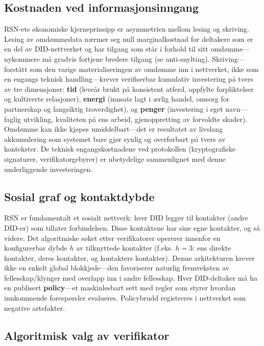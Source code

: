 \documentclass[11pt,a4paper,twocolumn]{article}
\begin{document}
\subsection{Kostnaden ved informasjonsinngang}

RSN-ets økonomiske kjerneprinsipp er asymmetrien mellom lesing og skriving. Lesing av omdømmedata nærmer seg null marginalkostnad for deltakere som er en del av DID-nettverket og har tilgang som står i forhold til sitt omdømme---nykommere må gradvis fortjene bredere tilgang (se anti-snylting). Skriving---forstått som den varige materialiseringen av omdømme inn i nettverket, ikke som en engangs teknisk handling---krever verifiserbar kumulativ investering på tvers av tre dimensjoner: \textbf{tid} (leveår brukt på konsistent atferd, oppfylte forpliktelser og kultiverte relasjoner), \textbf{energi} (innsats lagt i ærlig handel, omsorg for partnerskap og langsiktig troverdighet), og \textbf{penger} (investering i eget navn---faglig utvikling, kvaliteten på ens arbeid, gjenoppretting av forvoldte skader). Omdømme kan ikke kjøpes umiddelbart---det er resultatet av livslang akkumulering som systemet bare gjør synlig og overførbart på tvers av kontekster. De teknisk engangskostnadene ved protokollen (kryptografiske signaturer, verifikatorgebyrer) er ubetydelige sammenlignet med denne underliggende investeringen.

\subsection{Sosial graf og kontaktdybde}

RSN er fundamentalt et sosialt nettverk: hver DID legger til kontakter (andre DID-er) som tillater forbindelsen. Disse kontaktene har sine egne kontakter, og så videre. Det algoritmiske søket etter verifikatorer opererer innenfor en konfigurerbar dybde $h$ av tilknyttede kontakter (f.eks. $h=3$: ens direkte kontakter, deres kontakter, og kontakters kontakter). Denne arkitekturen krever ikke en enkelt global blokkjede---den favoriserer naturlig fremveksten av fellesskap/klynger med overlapp inn i andre fellesskap. Hver DID-deltaker må ha en publisert \textbf{policy}---et maskinlesbart sett med regler som styrer hvordan innkommende forespørsler evalueres. Policybrudd registreres i nettverket som negative artefakter.

\subsection{Algoritmisk valg av verifikator}
\end{document}

